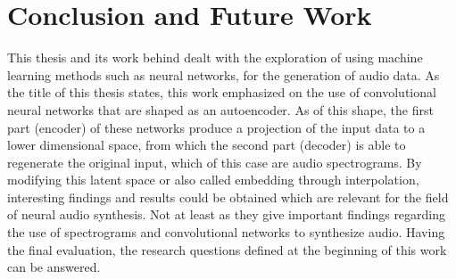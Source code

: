 \chapter{Conclusion and Future Work}
\label{cha:Conclusion}

This thesis and its work behind dealt with the exploration of using machine learning methods such as neural networks, for the generation of audio data. As the title of this thesis states, this work emphasized on the use of convolutional neural networks that are shaped as an autoencoder. As of this shape, the first part (encoder) of these networks produce a projection of the input data to a lower dimensional space, from which the second part (decoder) is able to regenerate the original input, which of this case are audio spectrograms. By modifying this latent space or also called embedding through interpolation, interesting findings and results could be obtained which are relevant for the field of neural audio synthesis. Not at least as they give important findings regarding the use of spectrograms and convolutional networks to synthesize audio. Having the final evaluation, the research questions defined at the beginning of this work can be answered.

